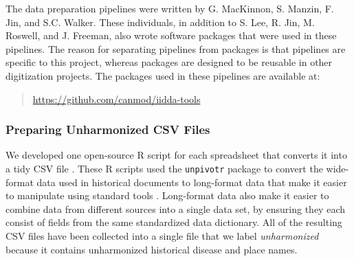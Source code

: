 \documentclass[12pt]{article}
\begin{document}
The data preparation pipelines were written by G. MacKinnon, S. Manzin, F. Jin, and S.C. Walker. These individuals, in addition to S. Lee, R. Jin, M. Roswell, and J. Freeman, also wrote software packages that were used in these pipelines. The reason for separating pipelines from packages is that pipelines are specific to this project, whereas packages are designed to be reusable in other digitization projects. The packages used in these pipelines are available at:
\begin{quote}
\url{https://github.com/canmod/iidda-tools}
\end{quote}

\subsubsection{Preparing Unharmonized CSV Files}\label{sec:appendix-unharmonized}

We developed one open-source R script for each spreadsheet that converts it into a tidy CSV file \cite{tidydata}. These R scripts used the \texttt{unpivotr} package \cite{unpivotr} to convert the wide-format data used in historical documents to long-format data that make it easier to manipulate using standard tools \cite{tidydata}. Long-format data also make it easier to combine data from different sources into a single data set, by ensuring they each consist of fields from the same standardized data dictionary. All of the resulting CSV files have been collected into a single file that we label \emph{unharmonized} because it contains unharmonized historical disease and place names.
\end{document}
